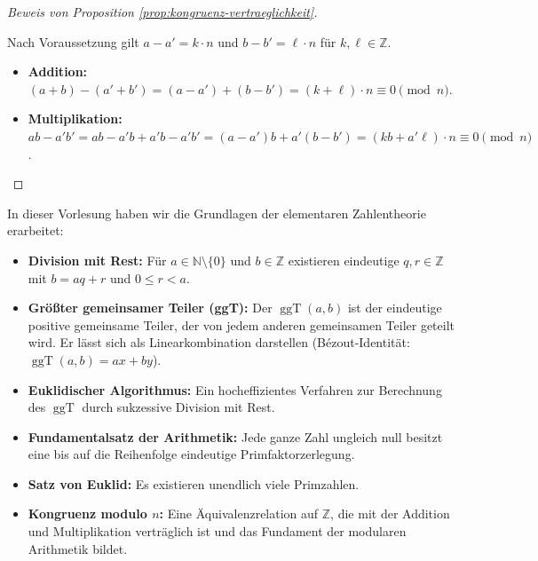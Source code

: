 \begin{proof}[Beweis von Proposition \ref{prop:kongruenz-vertraeglichkeit}]
\begin{math-stroke}
\begin{short-proof}
Nach Voraussetzung gilt $a - a' = k \cdot n$ und $b - b' = \ell \cdot n$ für $k, \ell \in \mathbb{Z}$.
\begin{itemize}
    \item \textbf{Addition:} $(a + b) - (a' + b') = (a - a') + (b - b') = (k + \ell) \cdot n \equiv 0 \pmod n$.
    \item \textbf{Multiplikation:} $ab - a'b' = ab - a'b + a'b - a'b' = (a - a')b + a'(b - b') = (kb + a'\ell) \cdot n \equiv 0 \pmod n$.
\end{itemize}
\end{short-proof}
\end{math-stroke}
\end{proof}

\begin{nice-box}
In dieser Vorlesung haben wir die Grundlagen der elementaren Zahlentheorie erarbeitet:
\begin{itemize}
    \item \textbf{Division mit Rest:} Für $a \in \mathbb{N} \setminus \{0\}$ und $b \in \mathbb{Z}$ existieren eindeutige $q, r \in \mathbb{Z}$ mit $b = aq + r$ und $0 \le r < a$.
    \item \textbf{Größter gemeinsamer Teiler (ggT):} Der $\operatorname{ggT}(a, b)$ ist der eindeutige positive gemeinsame Teiler, der von jedem anderen gemeinsamen Teiler geteilt wird. Er lässt sich als Linearkombination darstellen (Bézout-Identität: $\operatorname{ggT}(a, b) = ax + by$).
    \item \textbf{Euklidischer Algorithmus:} Ein hocheffizientes Verfahren zur Berechnung des $\operatorname{ggT}$ durch sukzessive Division mit Rest.
    \item \textbf{Fundamentalsatz der Arithmetik:} Jede ganze Zahl ungleich null besitzt eine bis auf die Reihenfolge eindeutige Primfaktorzerlegung.
    \item \textbf{Satz von Euklid:} Es existieren unendlich viele Primzahlen.
    \item \textbf{Kongruenz modulo $n$:} Eine Äquivalenzrelation auf $\mathbb{Z}$, die mit der Addition und Multiplikation verträglich ist und das Fundament der modularen Arithmetik bildet.
\end{itemize}
\end{nice-box}

\begin{ai-global-state-checkpoint-invisible-content}
\end{ai-global-state-checkpoint-invisible-content}

